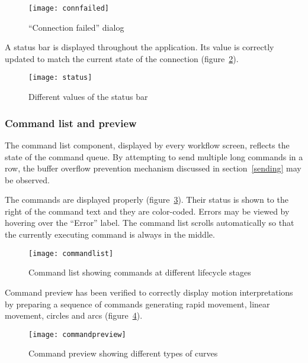 \begin{figure}[ht]
    \begin{center}
        \texttt{[image: connfailed]}
        \caption{``Connection failed'' dialog}
        \label{connfailed}
    \end{center}
\end{figure}

A status bar is displayed throughout the application. Its value is correctly
updated to match the current state of the connection (figure~\ref{status}).

\begin{figure}[ht]
    \begin{center}
        \texttt{[image: status]}
        \caption{Different values of the status bar}
        \label{status}
    \end{center}
\end{figure}

\subsubsection{Command list and preview}

The command list component, displayed by every workflow screen, reflects the
state of the command queue. By attempting to send multiple long commands in a
row, the buffer overflow prevention mechanism discussed in section~\ref{sending}
may be observed.

The commands are displayed properly (figure~\ref{commandlist}). Their status is
shown to the right of the command text and they are color-coded. Errors may be
viewed by hovering over the ``Error'' label. The command list scrolls
automatically so that the currently executing command is always in the middle.

\begin{figure}[ht]
    \begin{center}
        \texttt{[image: commandlist]}
        \caption{Command list showing commands at different lifecycle stages}
        \label{commandlist}
    \end{center}
\end{figure}

Command preview has been verified to correctly display motion interpretations
by preparing a sequence of commands generating rapid movement, linear movement,
circles and arcs (figure~\ref{commandpreview}).

\begin{figure}[ht]
    \begin{center}
        \texttt{[image: commandpreview]}
        \caption{Command preview showing different types of curves}
        \label{commandpreview}
    \end{center}
\end{figure}

